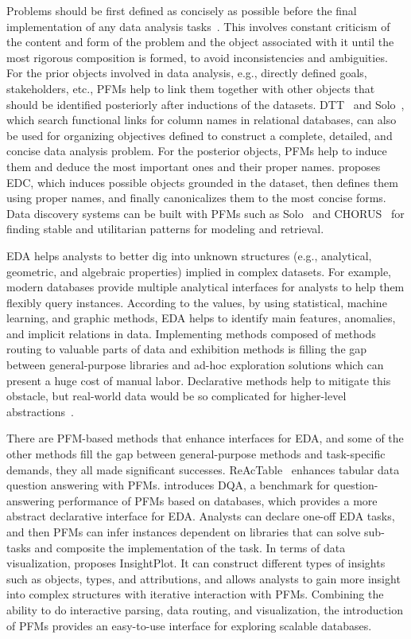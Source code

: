   
Problems should be first defined as concisely as possible before the final implementation of any data analysis tasks~\cite{myatt2007making}. This involves constant criticism of the content and form of the problem and the object associated with it until the most rigorous composition is formed, to avoid inconsistencies and ambiguities. For the prior objects involved in data analysis, e.g., directly defined goals, stakeholders, etc., PFMs help to link them together with other objects that should be identified posteriorly after inductions of the datasets. DTT~\cite{Nobari2023DTTAE} and Solo~\cite{Wang2023SoloDD}, which search functional links for column names in relational databases, can also be used for organizing objectives defined to construct a complete, detailed, and concise data analysis problem. For the posterior objects, PFMs help to induce them and deduce the most important ones and their proper names. \cite{ZhangS24} proposes EDC, which induces possible objects grounded in the dataset, then defines them using proper names, and finally canonicalizes them to the most concise forms. Data discovery systems can be built with PFMs such as Solo~\cite{Wang2023SoloDD} and CHORUS~\cite{CHORUS} for finding stable and utilitarian patterns for modeling and retrieval.
  
  EDA helps analysts to better dig into unknown structures (e.g., analytical, geometric, and algebraic properties) implied in complex datasets. For example, modern databases provide multiple analytical interfaces for analysts to help them flexibly query instances. According to the values, by using statistical, machine learning, and graphic methods, EDA helps to identify main features, anomalies, and implicit relations in data. Implementing methods composed of methods routing to valuable parts of data and exhibition methods is filling the gap between general-purpose libraries and ad-hoc exploration solutions which can present a huge cost of manual labor. Declarative methods help to mitigate this obstacle, but real-world data would be so complicated for higher-level abstractions~\cite{heer2010declarative, shih2018declarative, kim2022cicero}. 
  
  There are PFM-based methods that enhance interfaces for EDA, and some of the other methods fill the gap between general-purpose methods and task-specific demands, they all made significant successes. ReAcTable~\cite{ReActTable} enhances tabular data question answering with PFMs. \cite{zheng2024revolutionizing} introduces DQA, a benchmark for question-answering performance of PFMs based on databases, which provides a more abstract declarative interface for EDA. Analysts can declare one-off EDA tasks, and then PFMs can infer instances dependent on libraries that can solve sub-tasks and composite the implementation of the task. In terms of data visualization, \cite{ma2023insightpilot} proposes InsightPlot. It can construct different types of insights such as objects, types, and attributions, and allows analysts to gain more insight into complex structures with iterative interaction with PFMs. Combining the ability to do interactive parsing, data routing, and visualization, the introduction of PFMs provides an easy-to-use interface for exploring scalable databases. 
  
